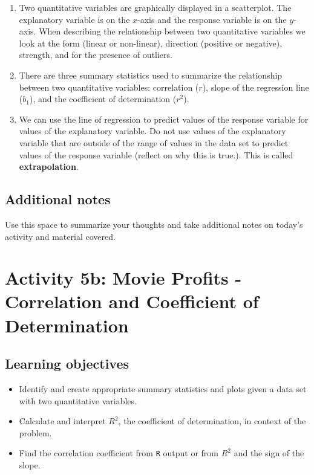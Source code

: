 \documentclass[
]{report}
\begin{document}
\begin{enumerate}
\def\labelenumi{\arabic{enumi}.}
\item
  Two quantitative variables are graphically displayed in a scatterplot. The explanatory variable is on the \(x\)-axis and the response variable is on the \(y\)-axis. When describing the relationship between two quantitative variables we look at the form (linear or non-linear), direction (positive or negative), strength, and for the presence of outliers.
\item
  There are three summary statistics used to summarize the relationship between two quantitative variables: correlation (\(r\)), slope of the regression line (\(b_1\)), and the coefficient of determination (\(r^2\)).
\item
  We can use the line of regression to predict values of the response variable for values of the explanatory variable. Do not use values of the explanatory variable that are outside of the range of values in the data set to predict values of the response variable (reflect on why this is true.). This is called \textbf{extrapolation}.
\end{enumerate}

\hypertarget{additional-notes-7}{%
\subsection{Additional notes}\label{additional-notes-7}}

Use this space to summarize your thoughts and take additional notes on today's activity and material covered.

\newpage

\hypertarget{activity-5b-movie-profits---correlation-and-coefficient-of-determination}{%
\section{Activity 5b: Movie Profits - Correlation and Coefficient of Determination}\label{activity-5b-movie-profits---correlation-and-coefficient-of-determination}}


\hypertarget{learning-objectives-4}{%
\subsection{Learning objectives}\label{learning-objectives-4}}

\begin{itemize}
\item
  Identify and create appropriate summary statistics and plots
  given a data set with two quantitative variables.
\item
  Calculate and interpret \(R^2\), the coefficient of determination, in context of the problem.
\item
  Find the correlation coefficient from \texttt{R} output or from \(R^2\) and the sign of the slope.
\end{itemize}
\end{document}
